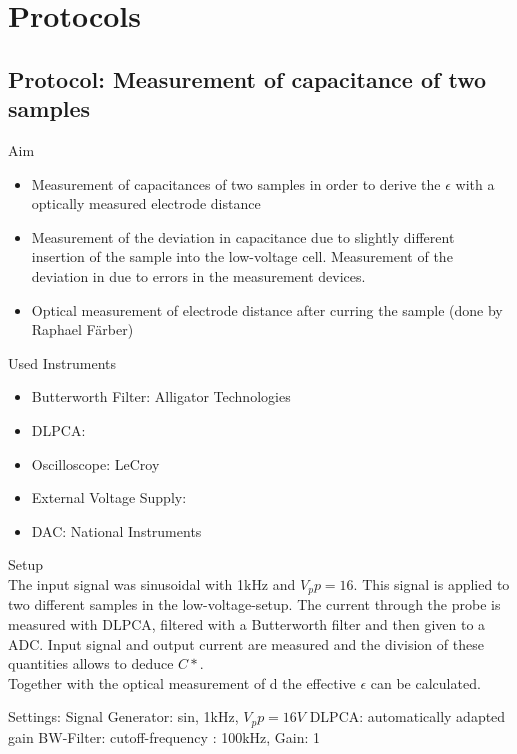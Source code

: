 \chapter{Protocols}
\section{Protocol: Measurement of capacitance of two samples}
\large{Aim} \\
\begin{itemize}

\item Measurement of capacitances of two samples in order to derive the $\epsilon$ with a optically measured electrode distance 
\item Measurement of the deviation in capacitance due to slightly different insertion of the sample into the low-voltage cell. Measurement of the deviation in due to errors in the measurement devices. 
\item Optical measurement of electrode distance after curring the sample (done by Raphael F\"arber) 
\end{itemize}

\large{Used Instruments} 
\begin{itemize}
 \item Butterworth Filter: Alligator Technologies 
 \item DLPCA: 
 \item Oscilloscope: LeCroy
 \item External Voltage Supply: 
 \item DAC: National Instruments 

\end{itemize}


\large{Setup} \\
The input signal was  sinusoidal with 1kHz and $V_pp=16$. This signal is applied to two different samples in the low-voltage-setup. The current through the probe is measured with DLPCA, filtered with a Butterworth filter and then given to a ADC. 
Input signal and output current are measured and the division of these quantities allows to deduce $C*$.\\

Together with the optical measurement of d the effective $\epsilon$ can be calculated. 

Settings: \newline
Signal Generator:  sin, 1kHz, $V_pp=16V$
DLPCA:  automatically adapted gain
BW-Filter:  cutoff-frequency : 100kHz, Gain: 1

